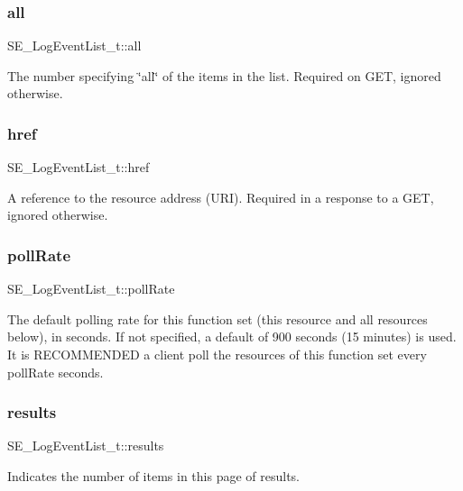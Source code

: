 \subsubsection{\texorpdfstring{all}{all}}
{\footnotesize\ttfamily S\+E\+\_\+\+Log\+Event\+List\+\_\+t\+::all}

The number specifying \char`\"{}all\char`\"{} of the items in the list. Required on G\+ET, ignored otherwise. \mbox{\label{group__LogEventList_ga2adcec0539539616990cb3ab699bc9e0}} 
\subsubsection{\texorpdfstring{href}{href}}
{\footnotesize\ttfamily S\+E\+\_\+\+Log\+Event\+List\+\_\+t\+::href}

A reference to the resource address (U\+RI). Required in a response to a G\+ET, ignored otherwise. \mbox{\label{group__LogEventList_ga388cf556e1a06ced33e78bbac0c0ab88}} 
\subsubsection{\texorpdfstring{poll\+Rate}{pollRate}}
{\footnotesize\ttfamily S\+E\+\_\+\+Log\+Event\+List\+\_\+t\+::poll\+Rate}

The default polling rate for this function set (this resource and all resources below), in seconds. If not specified, a default of 900 seconds (15 minutes) is used. It is R\+E\+C\+O\+M\+M\+E\+N\+D\+ED a client poll the resources of this function set every poll\+Rate seconds. \mbox{\label{group__LogEventList_ga6cfbe323819724f04cdb2a6ee4300628}} 
\subsubsection{\texorpdfstring{results}{results}}
{\footnotesize\ttfamily S\+E\+\_\+\+Log\+Event\+List\+\_\+t\+::results}

Indicates the number of items in this page of results. \mbox{\label{group__LogEventList_ga56149eb351e449cbb2722991e2daa1bc}} 
